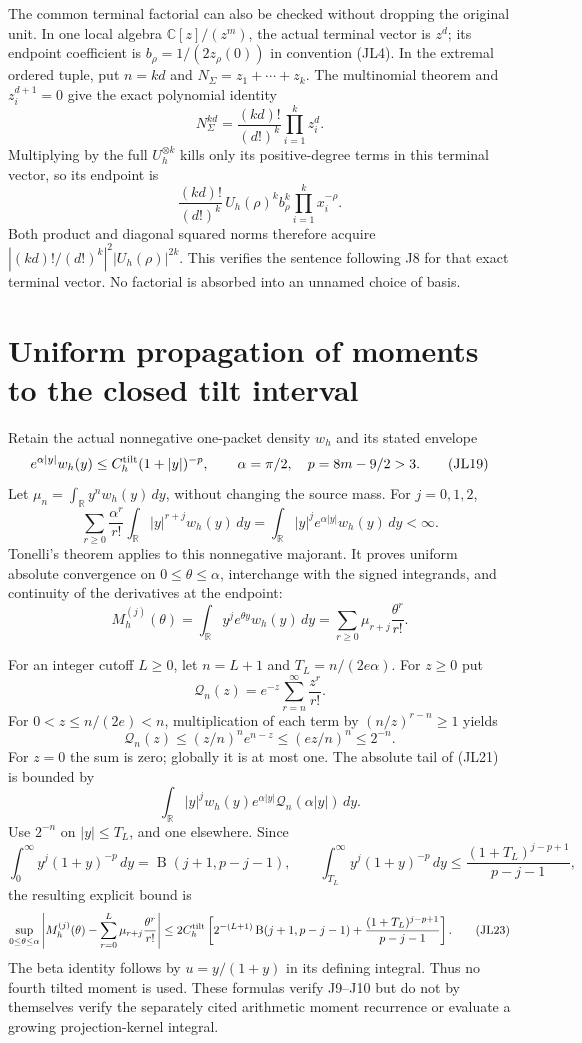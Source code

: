 \documentclass[11pt]{article}
\newcommand{\C}{\mathbb C}
\newcommand{\R}{\mathbb R}
\begin{document}
The common terminal factorial can also be checked without dropping the
original unit.  In one local algebra \(\C[z]/(z^m)\), the actual terminal
vector is \(z^d\); its endpoint coefficient is
\(b_\rho=1/(2z_\rho(0))\) in convention (JL4).
In the extremal ordered tuple, put \(n=kd\) and
\(N_\Sigma=z_1+\cdots+z_k\).  The multinomial theorem and \(z_i^{d+1}=0\)
give the exact polynomial identity
\[
N_\Sigma^{kd}=\frac{(kd)!}{(d!)^k}\prod_{i=1}^k z_i^d.
\tag{JL17}
\]
Multiplying by the full \(U_h^{\otimes k}\) kills only its positive-degree
terms in this terminal vector, so its endpoint is
\[
\frac{(kd)!}{(d!)^k}\,U_h(\rho)^k b_\rho^k
\prod_{i=1}^k x_i^{-\rho}.
\tag{JL18}
\]
Both product and diagonal squared norms therefore acquire
\(\left|(kd)!/(d!)^k\right|^2|U_h(\rho)|^{2k}\).
This verifies the sentence following J8 for that exact terminal vector.
No factorial is absorbed into an unnamed choice of basis.

\section{Uniform propagation of moments to the closed tilt interval}

Retain the actual nonnegative one-packet density \(w_h\) and its stated
envelope
\[
e^{\alpha|y|}w_h(y)\le C_h^{\rm tilt}(1+|y|)^{-p},
\qquad \alpha=\pi/2,\quad p=8m-9/2>3.
\tag{JL19}
\]
Let \(\mu_n=\int_\R y^nw_h(y)\,dy\), without changing the source mass.
For \(j=0,1,2\),
\[
\sum_{r\ge0}\frac{\alpha^r}{r!}
\int_\R |y|^{r+j}w_h(y)\,dy
=\int_\R |y|^je^{\alpha|y|}w_h(y)\,dy<\infty.
\tag{JL20}
\]
Tonelli's theorem applies to this nonnegative majorant.  It proves
uniform absolute convergence on \(0\le\theta\le\alpha\), interchange
with the signed integrands, and continuity of the derivatives at
the endpoint:
\[
M_h^{(j)}(\theta)
=\int_\R y^je^{\theta y}w_h(y)\,dy
=\sum_{r\ge0}\mu_{r+j}\frac{\theta^r}{r!}.
\tag{JL21}
\]

For an integer cutoff \(L\ge0\), let \(n=L+1\) and
\(T_L=n/(2e\alpha)\).  For \(z\ge0\) put
\[
\mathcal Q_n(z)=e^{-z}\sum_{r=n}^{\infty}\frac{z^r}{r!}.
\]
For \(0<z\le n/(2e)<n\), multiplication of each term by
\((n/z)^{r-n}\ge1\) yields
\[
\mathcal Q_n(z)
\le (z/n)^n e^{n-z}
\le(ez/n)^n\le2^{-n}.
\tag{JL22}
\]
For \(z=0\) the sum is zero; globally it is at most one.
The absolute tail of (JL21) is bounded by
\[
\int_\R |y|^jw_h(y)e^{\alpha|y|}
\mathcal Q_n(\alpha|y|)\,dy.
\]
Use \(2^{-n}\) on \(|y|\le T_L\), and one elsewhere.
Since
\[
\int_0^\infty y^j(1+y)^{-p}\,dy
=\operatorname B(j+1,p-j-1),\qquad
\int_{T_L}^\infty y^j(1+y)^{-p}\,dy
\le\frac{(1+T_L)^{j-p+1}}{p-j-1},
\]
the resulting explicit bound is
\[
\sup_{0\le\theta\le\alpha}
\left|M_h^{(j)}(\theta)
-\sum_{r=0}^{L}\mu_{r+j}\frac{\theta^r}{r!}\right|
\le2C_h^{\rm tilt}\left[
2^{-(L+1)}\operatorname B(j+1,p-j-1)
+\frac{(1+T_L)^{j-p+1}}{p-j-1}\right].
\tag{JL23}
\]
The beta identity follows by \(u=y/(1+y)\) in its defining integral.
Thus no fourth tilted moment is used.  These formulas verify J9--J10
but do not by themselves verify the separately cited arithmetic
moment recurrence or evaluate a growing projection-kernel integral.
\end{document}
